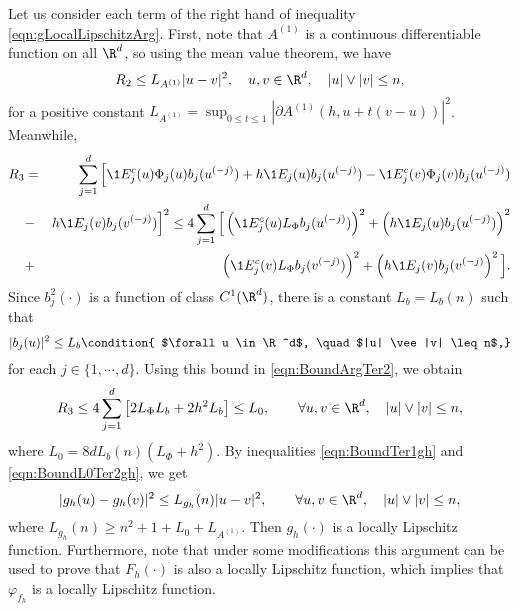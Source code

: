 \begin{pf}
	Let us consider each term of the right hand of inequality \eqref{eqn:gLocalLipschitzArg}.
	First, note that $A^{(1)}$ is a continuous differentiable function on all 
	$\R^d$, so using the mean value theorem,
	we have
	\begin{equation}\label{eqn:BoundTer1gh}
		R_2
		\leq
		L_{A^{(1)}}|u-v|^2, \quad u,v \in \R^d, \quad |u|\vee |v|\leq n,
	\end{equation}
	for a positive constant $L_{A^{(1)}} =\sup_{0\leq t \leq 1} 
		|\partial A^{(1)}(h, u+t(v-u))|^2$. Meanwhile, 
	\begin{eqnarray}
	R_3 &=&\sum_{j=1}^d\Big[\1{E_j^c}(u) \Phi_j(u) b_j(u^{(-j)}) + h \1{E_j}(u) b_j(u^{(-j)}) 
			-\1{E_j^c}(v) \Phi_j(v) b_j(u^{(-j)})\nonumber \\ &-& h \1{E_j}(v) b_j(v^{(-j)})
			\Big]^2 
			\leq
			4\sum_{j=1}^d
			\Big[
				\left(	
					\1{E_j^c}(u) L_{\Phi} b_j(u^{(-j)})  
				\right)^2
				+
				\left(
					h \1{E_j}(u) b_j(u^{(-j)})
				\right)^2
				\nonumber\\&+&
				\left(
					\1{E_j^c}(v) L_{\Phi} b_j(v^{(-j)})
				\right)^2
				+
				\left(
				 h \1{E_j}(v) b_j(v^{(-j)}
				\right)^2
			\Big].
		\label{eqn:BoundArgTer2}	
	\end{eqnarray}	
	Since  $b^2_j(\cdot)$ is a function of class $C^1(\R^d)$, there is a 
	constant $L_b=L_b(n)$ such that
	\begin{dmath}[label={eqn:Boundbju}]
		|b_j(u)|^2 \leq L_b 
		\condition{
			$\forall u \in \R^d$,
			\quad $|u| \vee |v| \leq n$,}		
	\end{dmath}
	for each $j \in \{1,\cdots, d\}$. Using this bound in  \eqref{eqn:BoundArgTer2}, we obtain
	\begin{equation}\label{eqn:BoundL0Ter2gh}
			R_3\leq
			4 \sum_{j=1}^d
				\left[
					2 L_{\Phi} L_b +2h^2 L_b
				\right] 
			\leq L_0, \qquad
				\forall u,v \in \R^d,
				\quad |u|\vee|v| \leq n,
	\end{equation}
	where $L_0=8d L_b(n)(L_{\Phi}+h^2)$.
	By inequalities \eqref{eqn:BoundTer1gh} and \eqref{eqn:BoundL0Ter2gh},  we get
	\begin{equation}
			|g_h(u) - g_h(v)|^2 \leq L_{g_h}(n) |u - v|^2, 
			\qquad	\forall u,v \in \R^d,
				\quad |u|\vee |v| \leq n,		
	\end{equation}
	 where $L_{g_h}(n)\geq n^2+1+L_0+ L_{A^{(1)}}$. Then $g_h(\cdot)$ is a locally 
	 Lipschitz function. Furthermore, note that under some modifications
	this argument can be used to prove that $F_h(\cdot)$ is also a locally Lipschitz 
	function, which implies that $\varphi_{f_{h}}$ is a locally Lipschitz function.

\end{pf}
